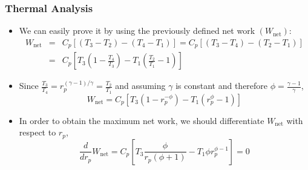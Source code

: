 \documentclass[10pt,compress]{beamer}
\newcommand{\frc}{\displaystyle\frac}
\begin{document}
\begin{frame}
 \frametitle{Thermal Analysis}
 \begin{itemize}
  \item <1-> We can easily prove it by using the previously defined net work $\left(W_{\text{net}}\right)$:
    \begin{eqnarray}
       W_{\text{net}}&=&C_{p}\left[\left(T_{3}-T_{2}\right)-\left(T_{4}-T_{1}\right)\right]=C_{p}\left[\left(T_{3}-T_{4}\right)-\left(T_{2}-T_{1}\right)\right] \nonumber \\
                   &=&C_{p}\left[T_{3}\left(1-\frc{T_{4}}{T_{3}}\right)-T_{1}\left(\frc{T_{2}}{T_{1}}-1\right)\right] \nonumber
    \end{eqnarray}
   \item <2-> Since $\frc{T_{3}}{T_{4}}=r_{p}^{\left(\gamma-1\right)/\gamma}=\frc{T_{2}}{T_{1}}$ and assuming $\gamma$ is constant and therefore $\phi=\frc{\gamma-1}{\gamma}$,
    \begin{displaymath}
     W_{\text{net}} = C_{p}\left[T_{3}\left(1-r_{p}^{-\phi}\right)-T_{1}\left(r_{p}^{\phi}-1\right)\right]
    \end{displaymath}
   \item <3-> In order to obtain the maximum net work, we should differentiate $W_{\text{net}}$ with respect to $r_{p}$,
    \begin{displaymath}
     \frc{d}{d r_{p}}W_{\text{net}}= C_{p} \left[ T_{3} \frc{\phi}{r_{p}\left(\phi+1\right)}-T_{1}\phi r_{p}^{\phi-1}\right]=0
    \end{displaymath}
 \end{itemize}
\end{frame}
\end{document}
